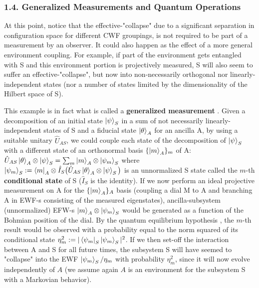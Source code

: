 \documentclass[11pt, a4paper]{article} %
\begin{document}
\subsubsection*{1.4. Generalized Measurements and Quantum Operations}\vspace{-0.1cm}
At this point, notice that the effective-"collapse" due to a significant separation in configuration space for different CWF groupings, is not required to be part of a measurement by an observer. It could also happen as the effect of a more general environment coupling. For example, if part of the environment gets entangled with S and this environment portion is projectively measured, S will also seem to suffer an effective-"collapse", but now into non-necessarily orthogonal nor linearly-independent states (nor a number of states limited by the dimensionality of the Hilbert space of S). 

This example is in fact what is called a {\bf generalized measurement} \cite{Generalized, Durr}. Given a decomposition of an initial state $\ket{\psi}_S$ in a sum of not necessarily linearly-independent states of S and a fiducial state $\ket{\theta}_A$ for an ancilla A, by using a suitable unitary $\hat{U}_{AS}$, we could couple each state of the decomposition of $\ket{\psi}_S$ with a different state of an orthonormal basis $\{\ket{m}_A\}_m$ of A: $\hat{U}_{AS}\ket{\theta}_A\otimes\ket{\psi}_S=\sum_m \ket{m}_A\otimes \ket{\psi_m}_S$ where $\ket{\psi_m}_S:=\bra{m}_A\otimes\hat{I}_S \big(\hat{U}_{AS}\ket{\theta}_A\otimes\ket{\psi}_S\big)$ is an unnormalized S state called the $m$-th {\bf conditional state} of S ($\hat{I}_S$ is the identity). If we now perform an ideal projective measurement on A for the $\{\ket{m}_A\}_A$ basis (coupling a dial M to A and branching A in EWF-s consisting of the measured eigenstates), ancilla-subsystem (unnormalized) EFW-s $\ket{m}_A\otimes \ket{\psi_m}_S$ would be generated as a function of the Bohmian position of the dial. By the quantum equilibrium hypothesis \cite{Absolute}, the $m$-th result would be observed with a probability equal to the norm squared of its conditional state $\eta_m^2:=|\bra{\psi_m}_S\ket{\psi_m}_S|^2$. If we then set-off the interaction between A and S for all future times, the subsystem S will have seemed to "collapse" into the EWF $\ket{\psi_m}_S/\eta_m$ with probability $\eta_m^2$, since it will now evolve independently of $A$ (we assume again $A$ is an environment for the subsystem S with a Markovian behavior).
\end{document}
